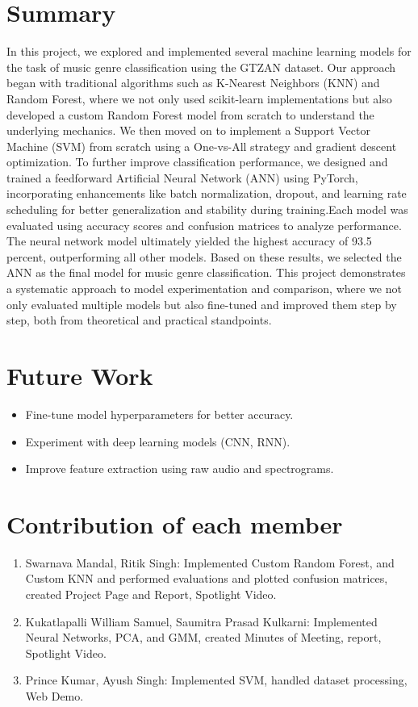 \documentclass[a4paper]{article}
\theoremstyle{plain}
\theoremstyle{definition}
\begin{document}
\section{Summary}
\label{sec:summary}
In this project, we explored and implemented several machine learning models for the task of music genre classification using the GTZAN dataset. Our approach began with traditional algorithms such as K-Nearest Neighbors (KNN) and Random Forest, where we not only used scikit-learn implementations but also developed a custom Random Forest model from scratch to understand the underlying mechanics. We then moved on to implement a Support Vector Machine (SVM) from scratch using a One-vs-All strategy and gradient descent optimization. To further improve classification performance, we designed and trained a feedforward Artificial Neural Network (ANN) using PyTorch, incorporating enhancements like batch normalization, dropout, and learning rate scheduling for better generalization and stability during training.Each model was evaluated using accuracy scores and confusion matrices to analyze performance. The neural network model ultimately yielded the highest accuracy of 93.5 percent, outperforming all other models. Based on these results, we selected the ANN as the final model for music genre classification.
This project demonstrates a systematic approach to model experimentation and comparison, where we not only evaluated multiple models but also fine-tuned and improved them step by step, both from theoretical and practical standpoints.

\section{Future Work}
\begin{itemize}
    \item Fine-tune model hyperparameters for better accuracy.
    \item Experiment with deep learning models (CNN, RNN).
    \item Improve feature extraction using raw audio and spectrograms.
\end{itemize}



\appendix

\section{Contribution of each member}
\label{sec:contribution}
\begin{enumerate}
    \item Swarnava Mandal, Ritik Singh: Implemented Custom Random Forest,   and Custom KNN and performed evaluations and plotted confusion matrices, created Project Page and  Report, Spotlight Video.
    \item Kukatlapalli William Samuel, Saumitra Prasad Kulkarni: Implemented Neural Networks, PCA, and GMM, created Minutes of Meeting, report, Spotlight Video.
    \item Prince Kumar, Ayush Singh: Implemented SVM, handled dataset processing, Web Demo.
\end{enumerate}
\end{document}
